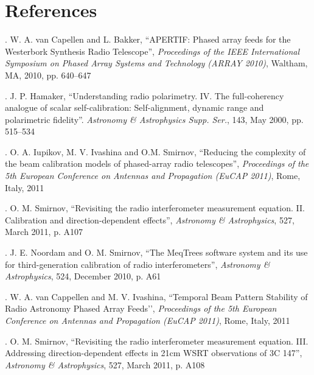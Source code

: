 \documentclass{aps2010} \special{papersize=8.5in,11in}
\begin{document}
\section{References}

. W. A. van Capellen and L. Bakker, ``APERTIF: Phased array feeds for the Westerbork Synthesis Radio Telescope'', \emph{Proceedings of the IEEE International Symposium on Phased Array Systems and Technology (ARRAY 2010)}, Waltham, MA, 2010, pp. 640--647

. J. P. Hamaker, ``Understanding radio polarimetry. IV. The full-coherency analogue of scalar self-calibration: Self-alignment, dynamic range and polarimetric fidelity''.
\emph{Astronomy \& Astrophysics Supp. Ser.}, 143, May 2000, pp. 515--534

. O. A. Iupikov, M. V. Ivashina and O.M. Smirnov, ``Reducing the complexity of the beam calibration models of phased-array radio telescopes'', \emph{Proceedings of the 5th European Conference on Antennas and Propagation (EuCAP 2011)}, Rome, Italy, 2011

. O. M. Smirnov, ``Revisiting the radio interferometer measurement equation. II. Calibration and direction-dependent effects'',
\emph{Astronomy \& Astrophysics}, 527, March 2011, p. A107

. J. E. Noordam and O. M. Smirnov, ``The MeqTrees software system and its use for third-generation calibration of radio interferometers'',
\emph{Astronomy \& Astrophysics}, 524, December 2010, p. A61

. W. A. van Cappellen and M. V. Ivashina, ``Temporal Beam Pattern Stability of Radio Astronomy Phased Array Feeds’',
\emph{Proceedings of the 5th European Conference on Antennas and Propagation (EuCAP 2011)}, Rome, Italy, 2011

. O. M. Smirnov, ``Revisiting the radio interferometer measurement equation. III. Addressing direction-dependent effects in 21cm WSRT observations of 3C 147'',
\emph{Astronomy \& Astrophysics}, 527, March 2011, p. A108
\end{document}
